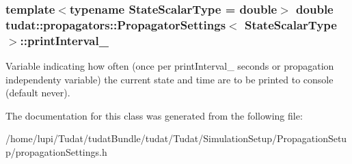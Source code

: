 \subsubsection[{\texorpdfstring{print\+Interval\+\_\+}{printInterval_}}]{\setlength{\rightskip}{0pt plus 5cm}template$<$typename State\+Scalar\+Type  = double$>$ double {\bf tudat\+::propagators\+::\+Propagator\+Settings}$<$ State\+Scalar\+Type $>$\+::print\+Interval\+\_\+\hspace{0.3cm}{\ttfamily [protected]}}\hypertarget{classtudat_1_1propagators_1_1PropagatorSettings_a9bc60706ee9ab673ed2caec05e716847}{}\label{classtudat_1_1propagators_1_1PropagatorSettings_a9bc60706ee9ab673ed2caec05e716847}
Variable indicating how often (once per print\+Interval\+\_\+ seconds or propagation independenty variable) the current state and time are to be printed to console (default never). 

The documentation for this class was generated from the following file\+:\begin{DoxyCompactItemize}
\item 
/home/lupi/\+Tudat/tudat\+Bundle/tudat/\+Tudat/\+Simulation\+Setup/\+Propagation\+Setup/propagation\+Settings.\+h\end{DoxyCompactItemize}
